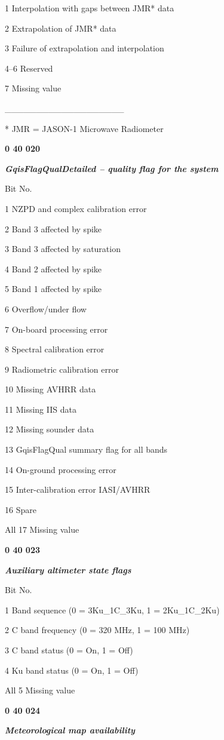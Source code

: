 1 Interpolation with gaps between JMR* data

2 Extrapolation of JMR* data

3 Failure of extrapolation and interpolation

4--6 Reserved

7 Missing value

\_\_\_\_\_\_\_\_\_\_\_\_\_\_\_\_\_\_\_

* JMR = JASON-1 Microwave Radiometer

\textbf{0 40 020}

\emph{\textbf{GqisFlagQualDetailed -- quality flag for the system}}

Bit No.

1 NZPD and complex calibration error

2 Band 3 affected by spike

3 Band 3 affected by saturation

4 Band 2 affected by spike

5 Band 1 affected by spike

6 Overflow/under flow

7 On-board processing error

8 Spectral calibration error

9 Radiometric calibration error

10 Missing AVHRR data

11 Missing IIS data

12 Missing sounder data

13 GqisFlagQual summary flag for all bands

14 On-ground processing error

15 Inter-calibration error IASI/AVHRR

16 Spare

All 17 Missing value

\textbf{0 40 023}

\emph{\textbf{Auxiliary altimeter state flags}}

Bit No.

1 Band sequence (0 = 3Ku\_1C\_3Ku, 1 = 2Ku\_1C\_2Ku)

2 C band frequency (0 = 320 MHz, 1 = 100 MHz)

3 C band status (0 = On, 1 = Off)

4 Ku band status (0 = On, 1 = Off)

All 5 Missing value

\textbf{0 40 024}

\emph{\textbf{Meteorological map availability}}

